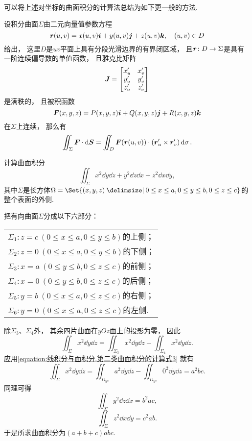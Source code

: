 可以将上述对坐标的曲面积分的计算法总结为如下更一般的方法.
\begin{theorem}
设积分曲面\(\Sigma\)由二元向量值参数方程\[
	\boldsymbol{r}(u,v) = x(u,v) \boldsymbol{i} + y(u,v) \boldsymbol{j} + z(u,v) \boldsymbol{k},
	\quad (u,v) \in D
\]给出，
这里\(D\)是\(uv\)平面上具有分段光滑边界的有界闭区域，
且\(\boldsymbol{r}\colon D \to \Sigma\)是具有一阶连续偏导数的单值函数，
且雅克比矩阵\[
	\boldsymbol{J} = \begin{bmatrix}
		x'_u & x'_v \\
		y'_u & y'_v \\
		z'_u & z'_v
	\end{bmatrix}
\]是满秩的，
且被积函数\[
	\boldsymbol{F}(x,y,z) = P(x,y,z) \boldsymbol{i} + Q(x,y,z) \boldsymbol{j} + R(x,y,z) \boldsymbol{k}
\]在\(\Sigma\)上连续，
那么有\begin{equation}
	\iint_\Sigma \boldsymbol{F} \cdot \dd{\boldsymbol{S}}
	= \iint_D \boldsymbol{F}(\boldsymbol{r}(u,v)) \cdot (\boldsymbol{r}'_u \times \boldsymbol{r}'_v) \dd{\sigma}.
\end{equation}
\end{theorem}

\begin{example}
计算曲面积分\[
	\iint_\Sigma x^2 \dd{y}\dd{z} + y^2 \dd{z}\dd{x} + z^2 \dd{x}\dd{y},
\]
其中\(\Sigma\)是长方体\(\Omega = \Set{
	(x,y,z)
	\given
	0 \leq x \leq a,
	0 \leq y \leq b,
	0 \leq z \leq c
}\)的整个表面的外侧.
\begin{solution}
把有向曲面\(\Sigma\)分成以下六部分：
\begin{center}
	\begin{tabular}{l}
		\(\Sigma_1: z=c\ (0 \leq x \leq a, 0 \leq y \leq b)\)的上侧； \\
		\(\Sigma_2: z=0\ (0 \leq x \leq a, 0 \leq y \leq b)\)的下侧； \\
		\(\Sigma_3: x=a\ (0 \leq y \leq b, 0 \leq z \leq c)\)的前侧； \\
		\(\Sigma_4: x=0\ (0 \leq y \leq b, 0 \leq z \leq c)\)的后侧； \\
		\(\Sigma_5: y=b\ (0 \leq x \leq a, 0 \leq z \leq c)\)的右侧； \\
		\(\Sigma_6: y=0\ (0 \leq x \leq a, 0 \leq z \leq c)\)的左侧. \\
	\end{tabular}
\end{center}
除\(\Sigma_3\)、\(\Sigma_4\)外，
其余四片曲面在\(yOz\)面上的投影为零，
因此\[
	\iint_\Sigma x^2 \dd{y}\dd{z}
	= \iint_{\Sigma_3} x^2 \dd{y}\dd{z}
	+ \iint_{\Sigma_4} x^2 \dd{y}\dd{z}.
\]
应用\cref{equation:线积分与面积分.第二类曲面积分的计算式3} 就有\[
	\iint_\Sigma x^2 \dd{y}\dd{z}
	= \iint_{D_{yz}} a^2 \dd{y}\dd{z}
	- \iint_{D_{yz}} 0^2 \dd{y}\dd{z}
	= a^2 bc.
\]
同理可得\[
	\iint_\Sigma y^2 \dd{z}\dd{x}
	= b^2 ac,
\]\[
	\iint_\Sigma z^2 \dd{x}\dd{y}
	= c^2 ab.
\]
于是所求曲面积分为\((a+b+c) abc\).
\end{solution}
\end{example}

